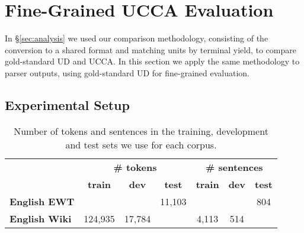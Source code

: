 \documentclass[11pt,a4paper]{article}
\begin{document}
\section{Fine-Grained UCCA Evaluation}\label{sec:fine_grained}

In \S\ref{sec:analysis} we used our comparison methodology,
consisting of the conversion to a shared format and matching units by terminal yield,
to compare gold-standard UD and UCCA.
In this section we apply the same methodology to parser outputs,
using gold-standard UD for fine-grained evaluation.

\subsection{Experimental Setup}\label{sec:experiments}

\begin{table}[t]
\centering
\small
\setlength\tabcolsep{3.25pt}
\begin{tabular}{l|ccc|ccc}
& \multicolumn{3}{c|}{\footnotesize \bf {\#} tokens}
& \multicolumn{3}{c}{\footnotesize \bf {\#} sentences} \\
& \footnotesize \bf train & \footnotesize \bf dev & \footnotesize \bf test
& \footnotesize \bf train & \footnotesize \bf dev & \footnotesize \bf test \\
\hline
\bf English EWT &&& 11,103 &&& 804 \\
\bf English Wiki & 124,935 & 17,784 & & 4,113 & 514 & \\
\end{tabular}
\caption{Number of tokens and sentences in the training, development and test sets
we use for each corpus.
\label{tab:corpora}}
\end{table}
\end{document}
